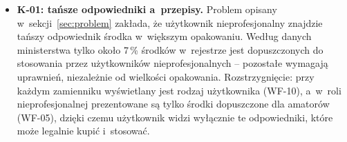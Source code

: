 \begin{itemize}
    \item \textbf{K-01: tańsze odpowiedniki a~przepisy.} Problem opisany
    w~sekcji~\ref{sec:problem} zakłada, że użytkownik nieprofesjonalny
    znajdzie tańszy odpowiednik środka w~większym opakowaniu.
    Według danych ministerstwa tylko około 7\,\% środków w~rejestrze jest
    dopuszczonych do stosowania przez użytkowników nieprofesjonalnych --
    pozostałe wymagają uprawnień, niezależnie od wielkości opakowania. Rozstrzygnięcie: przy każdym
    zamienniku wyświetlany jest rodzaj użytkownika (WF-10), a~w~roli
    nieprofesjonalnej prezentowane są tylko środki dopuszczone dla amatorów
    (WF-05), dzięki czemu użytkownik widzi wyłącznie te odpowiedniki, które
    może legalnie kupić i~stosować.
\end{itemize}
